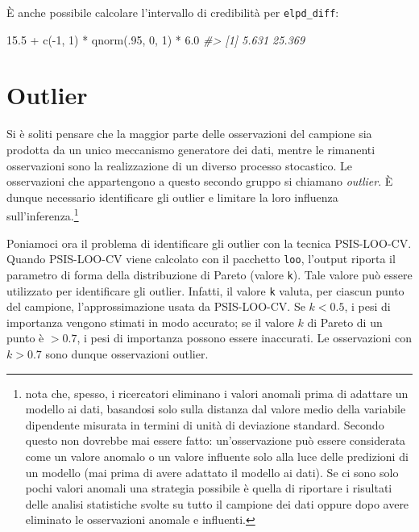 \documentclass[
  11pt,
]{krantz}
\makeatletter
\newenvironment{Shaded}{\begin{snugshade}}{\end{snugshade}}
\newcommand{\CommentTok}[1]{\textcolor[rgb]{0.37,0.37,0.37}{\textit{#1}}}
\newcommand{\DecValTok}[1]{\textcolor[rgb]{0.06,0.06,0.06}{#1}}
\newcommand{\FloatTok}[1]{\textcolor[rgb]{0.06,0.06,0.06}{#1}}
\newcommand{\FunctionTok}[1]{\textcolor[rgb]{0,0,0}{#1}}
\newcommand{\NormalTok}[1]{#1}
\newcommand{\SpecialCharTok}[1]{\textcolor[rgb]{0,0,0}{#1}}
\newenvironment{kframe}{%
\medskip{}
\setlength{\fboxsep}{.8em}
 \def\at@end@of@kframe{}%
 \ifinner\ifhmode%
  \def\at@end@of@kframe{\end{minipage}}%
  \begin{minipage}{\columnwidth}%
 \fi\fi%
 \def\FrameCommand##1{\hskip\@totalleftmargin \hskip-\fboxsep
 \colorbox{shadecolor}{##1}\hskip-\fboxsep
     \hskip-\linewidth \hskip-\@totalleftmargin \hskip\columnwidth}%
 \MakeFramed {\advance\hsize-\width
   \@totalleftmargin\z@ \linewidth\hsize
   \@setminipage}}%
 {\par\unskip\endMakeFramed%
 \at@end@of@kframe}
\renewenvironment{Shaded}{\begin{kframe}}{\end{kframe}}
\theoremstyle{definition}
\theoremstyle{definition}
\theoremstyle{definition}
\theoremstyle{definition}
\theoremstyle{remark}
\makeatother
\begin{document}
È anche possibile calcolare l'intervallo di credibilità per \texttt{elpd\_diff}:

\begin{Shaded}
\begin{Highlighting}[]
\FloatTok{15.5} \SpecialCharTok{+} \FunctionTok{c}\NormalTok{(}\SpecialCharTok{{-}}\DecValTok{1}\NormalTok{, }\DecValTok{1}\NormalTok{) }\SpecialCharTok{*} \FunctionTok{qnorm}\NormalTok{(.}\DecValTok{95}\NormalTok{, }\DecValTok{0}\NormalTok{, }\DecValTok{1}\NormalTok{) }\SpecialCharTok{*} \FloatTok{6.0}
\CommentTok{\#\textgreater{} [1]  5.631 25.369}
\end{Highlighting}
\end{Shaded}

\hypertarget{outlier}{%
\section{Outlier}\label{outlier}}

Si è soliti pensare che la maggior parte delle osservazioni del campione sia prodotta da un unico meccanismo generatore dei dati, mentre le rimanenti osservazioni sono la realizzazione di un diverso processo stocastico. Le osservazioni che appartengono a questo secondo gruppo si chiamano \emph{outlier}. È dunque necessario identificare gli outlier e limitare la loro influenza sull'inferenza.\footnote{\citet{McElreath_rethinking} nota che, spesso, i ricercatori eliminano i valori anomali prima di adattare un modello ai dati, basandosi solo sulla distanza dal valore medio della variabile dipendente misurata in termini di unità di deviazione standard. Secondo \citet{McElreath_rethinking} questo non dovrebbe mai essere fatto: un'osservazione può essere considerata come un valore anomalo o un valore influente solo alla luce delle predizioni di un modello (mai prima di avere adattato il modello ai dati). Se ci sono solo pochi valori anomali una strategia possibile è quella di riportare i risultati delle analisi statistiche svolte su tutto il campione dei dati oppure dopo avere eliminato le osservazioni anomale e influenti.}

Poniamoci ora il problema di identificare gli outlier con la tecnica PSIS-LOO-CV. Quando PSIS-LOO-CV viene calcolato con il pacchetto \texttt{loo}, l'output riporta il parametro di forma della distribuzione di Pareto (valore \texttt{k}). Tale valore può essere utilizzato per identificare gli outlier. Infatti, il valore \texttt{k} valuta, per ciascun punto del campione, l'approssimazione usata da PSIS-LOO-CV. Se \(k < 0.5\), i pesi di importanza vengono stimati in modo accurato; se il valore \(k\) di Pareto di un punto è \(> 0.7\), i pesi di importanza possono essere inaccurati. Le osservazioni con \(k > 0.7\) sono dunque osservazioni outlier.
\end{document}
